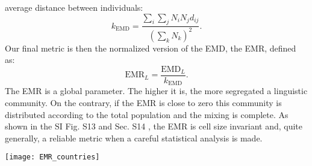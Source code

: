 \documentclass[../thesis.tex]{subfiles}
\begin{document}
average distance between individuals:
\begin{equation}
    k_\text{EMD} = \frac{\sum_i \sum_j N_i N_j d_{ij} }{\left( \sum_k N_k \right)^2}.
\end{equation}
Our final metric is then the normalized version of the \ac{EMD}, the \ac{EMR}, defined as:
\begin{equation}
\text{EMR}_L = \frac{\text{EMD}_L}{k_\text{EMD}} .
\end{equation}
The \ac{EMR} is a global parameter. The higher it is, the more segregated a linguistic
community. On the contrary, if the \ac{EMR} is close to zero this community is distributed
according to the total population and the mixing is complete. As shown in the SI Fig.
S13 and Sec. S14 \cite{supp}, the \ac{EMR} is cell size invariant and, quite generally, a
reliable metric when a careful statistical analysis is made.

\begin{figure*}[p!]
  \centering
  \texttt{[image: EMR\_countries]}
  \caption{\acp{EMR} of the (a) monolingual and (b) multilingual groups of multilingual
  regions of interest, ranked left to right by increasing average of the $y$-axis
  values. In (b), the point for trilinguals in Switzerland is not displayed
  because its value was deemed unreliable (for more details see SI Sec. IF
  \cite{supp}). A rich diversity of mixing patterns is shown, beyond the two
  paradigmatic cases of Catalonia and Belgium.}
  \label{fig:EMR_countries}
\end{figure*}
\end{document}
